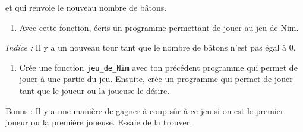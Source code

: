 \documentclass[a4paper,french,11pt]{article}
\providecommand{\tightlist}{%
  \setlength{\itemsep}{0pt}\setlength{\parskip}{0pt}}
\begin{document}
et qui renvoie le nouveau nombre de bâtons.

\begin{enumerate}
\def\labelenumi{\arabic{enumi}.}
\setcounter{enumi}{1}
\tightlist
\item
  Avec cette fonction, écris un programme permettant de jouer au jeu de
  Nim.
\end{enumerate}

\emph{Indice :} Il y a un nouveau tour tant que le nombre de bâtons
n'est pas égal à 0.

\begin{enumerate}
\def\labelenumi{\arabic{enumi}.}
\setcounter{enumi}{2}
\tightlist
\item
  Crée une fonction \texttt{jeu_de_Nim} avec ton précédent
  programme qui permet de jouer à une partie du jeu. Ensuite, crée un
  programme qui permet de jouer tant que le joueur ou la joueuse le
  désire.
\end{enumerate}

Bonus : Il y a une manière de gagner à coup sûr à ce jeu si on est le
premier joueur ou la première joueuse. Essaie de la trouver.
\end{document}
